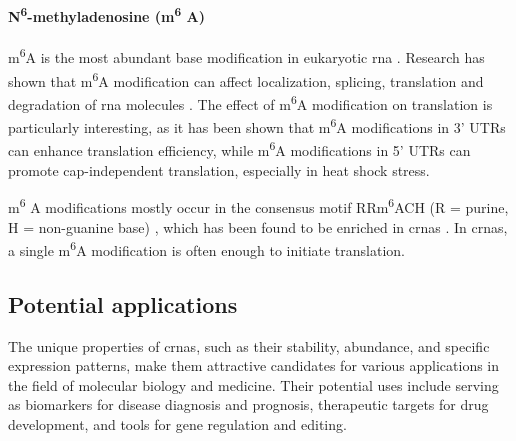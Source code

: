 \paragraph{N\textsuperscript{6}-methyladenosine (m\textsuperscript{6}
    A)}  m\textsuperscript{6}A is the most abundant base modification in eukaryotic
\gls{rna} \supercite{yang_extensive_2017,li_pivotal_2014,wei_methylated_1975}.
Research has shown that m\textsuperscript{6}A modification can affect
localization, splicing, translation and degradation of \gls{rna} molecules
\supercite{yue_rna_2015,meyer_dynamic_2014}.
The effect of m\textsuperscript{6}A modification on translation is particularly
interesting, as it has been shown that m\textsuperscript{6}A modifications in
3' UTRs can enhance translation
efficiency\supercite{wang_n6-methyladenosine_2015}, while m\textsuperscript{6}A
modifications in 5' UTRs can promote cap-independent translation, especially in
heat shock stress\supercite{zhou_dynamic_2015,meyer_5_2015}.

m\textsuperscript{6}
A modifications mostly occur in the consensus motif RRm\textsuperscript{6}ACH
(R = purine, H = non-guanine base)
\supercite{csepany_sequence_1990,harper_sequence_1990}, which has been found to
be enriched in \glspl{crna} \supercite{yang_extensive_2017}.
In \glspl{crna}, a single m\textsuperscript{6}A modification is often enough to
initiate translation\supercite{yang_extensive_2017}.

\subsection{Potential applications}
\label{sec:circrna_applications}
The unique properties of \glspl{crna}, such as their stability, abundance, and
specific expression patterns, make them attractive candidates for various
applications in the field of molecular biology and medicine.
Their potential uses include serving as biomarkers for disease diagnosis and
prognosis, therapeutic targets for drug development, and tools for gene
regulation and editing.


